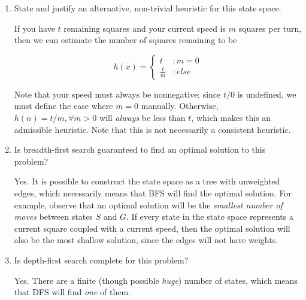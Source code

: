 \documentclass[12pt]{article}
\begin{document}
\begin{enumerate}
\item State and justify an alternative, non-trivial heuristic for this state space.
\begin{solution}
If you have $t$ remaining squares and your current speed is $m$ squares per turn, then we can estimate the number of squares remaining to be

\begin{displaymath}
   h(x) = \left\{
     \begin{array}{ll}
       t & : m = 0 \\
       \frac{t}{m} & : else
     \end{array}
   \right.
\end{displaymath}

Note that your speed must always be nonnegative; since $t / 0$ is undefined, we must define the case where $m = 0$ manually. Otherwise, $h(n) = t / m, \forall m > 0$ will \textit{always} be less than $t$, which makes this an admissible heuristic. Note that this is not necessarily a consistent heuristic.
\end{solution}

\item Is breadth-first search guaranteed to find an optimal solution to this problem?
\begin{solution}
Yes. It is possible to construct the state space as a tree with unweighted edges, which necessarily means that BFS will find the optimal solution. For example, observe that an optimal solution will be the \textit{smallest number of moves} between states $S$ and $G$. If every state in the state space represents a current square coupled with a current speed, then the optimal solution will also be the most shallow solution, since the edges will not have weights.
\end{solution}

\item Is depth-first search complete for this problem?
\begin{solution}
Yes. There are a finite (though possible \textit{huge}) number of states, which means that DFS will find \textit{one} of them.
\end{solution}

\end{enumerate}
\end{document}
